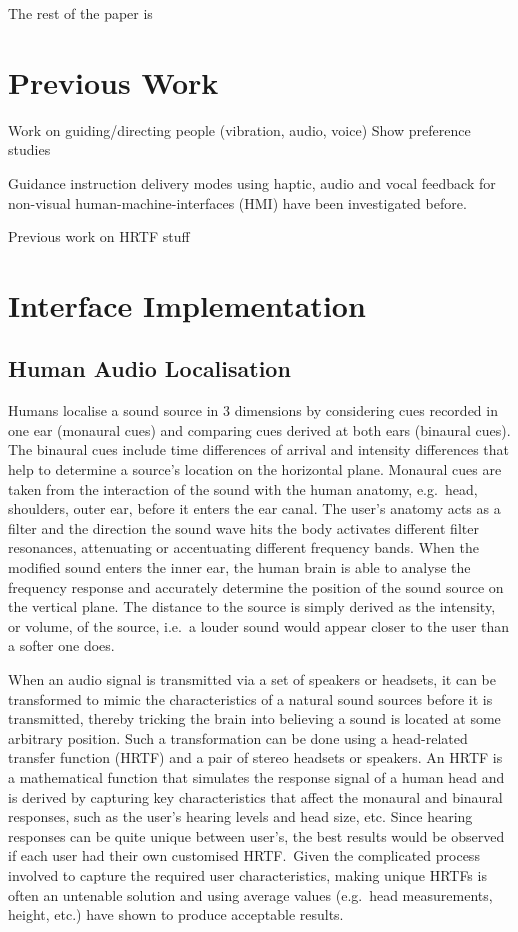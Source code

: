\documentclass{llncs}
\begin{document}
The rest of the paper is 

\section{Previous Work}

Work on guiding/directing people (vibration, audio, voice)
Show preference studies

Guidance instruction delivery modes using haptic, audio and vocal feedback for non-visual human-machine-interfaces (HMI) have been investigated before. 

Previous work on HRTF stuff

\section{Interface Implementation}

\subsection{Human Audio Localisation}

Humans localise a sound source in 3 dimensions by considering cues recorded in one ear (monaural cues) and comparing cues derived at both ears (binaural cues)\cite{blauert1997spatial,blauert1969sound}.
The binaural cues include time differences of arrival and intensity differences that help to determine a source's location on the horizontal plane.
Monaural cues are taken from the interaction of the sound with the human anatomy, e.g.\ head, shoulders, outer ear, before it enters the ear canal.
The user's anatomy acts as a filter and the direction the sound wave hits the body activates different filter resonances, attenuating or accentuating different frequency bands.
When the modified sound enters the inner ear, the human brain is able to analyse the frequency response and accurately determine the position of the sound source on the vertical plane. 
The distance to the source is simply derived as the intensity, or volume, of the source, i.e.\ a louder sound would appear closer to the user than a softer one does. 

When an audio signal is transmitted via a set of speakers or headsets, it can be transformed to mimic the characteristics of a natural sound sources before it is transmitted, thereby tricking the brain into believing a sound is located at some arbitrary position.
Such a transformation can be done using a head-related transfer function (HRTF) and a pair of stereo headsets or speakers.
An HRTF is a mathematical function that simulates the response signal of a human head and is derived by capturing key characteristics that affect the monaural and binaural responses, such as the user's hearing levels and head size, etc.
Since hearing responses can be quite unique between user's, the best results would be observed if each user had their own customised HRTF.\
Given the complicated process involved to capture the required user characteristics, making unique HRTFs is often an untenable solution and using average values (e.g.\ head measurements, height, etc.) have shown to produce acceptable results.
\end{document}
